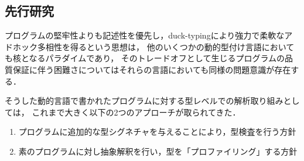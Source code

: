 %
%


\subsection{先行研究}


プログラムの堅牢性よりも記述性を優先し，duck-typingにより強力で柔軟なアドホック多相性を得るという思想は，
他のいくつかの動的型付け言語においても核となるパラダイムであり，
そのトレードオフとして生じるプログラムの品質保証に伴う困難さについてはそれらの言語においても同様の問題意識が存在する．

そうした動的言語で書かれたプログラムに対する型レベルでの解析取り組みとしては，
これまで大きく以下の2つのアプローチが取られてきた．

\begin{enumerate}
  \item プログラムに追加的な型シグネチャを与えることにより，型検査を行う方針
  \item 素のプログラムに対し抽象解釈を行い，型を「プロファイリング」する方針
\end{enumerate}

